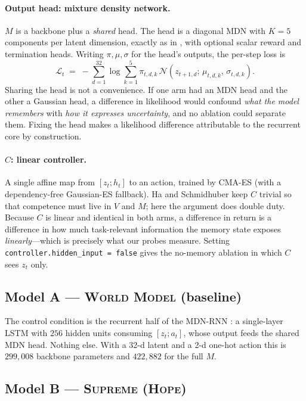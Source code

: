 \documentclass[11pt,a4paper]{article}
\newcommand{\code}[1]{\texttt{\small #1}}
\newcommand{\WM}{\textsc{World Model}}
\newcommand{\SUP}{\textsc{Supreme}}
\begin{document}
\paragraph{Output head: mixture density network.} $M$ is a backbone plus a
\emph{shared} head. The head is a diagonal MDN with $K=5$ components per latent
dimension, exactly as in \cite[\S2.2]{ha2018world}, with optional scalar reward
and termination heads. Writing $\pi,\mu,\sigma$ for the head's outputs, the
per-step loss is
\begin{equation}
\mathcal{L}_t \;=\; -\sum_{d=1}^{32}\log \sum_{k=1}^{5}
   \pi_{t,d,k}\,\mathcal{N}\!\left(z_{t+1,d};\,\mu_{t,d,k},\,\sigma_{t,d,k}\right).
\label{eq:mdn}
\end{equation}
Sharing the head is not a convenience. If one arm had an MDN head and the other
a Gaussian head, a difference in likelihood would confound \emph{what the model
remembers} with \emph{how it expresses uncertainty}, and no ablation could
separate them. Fixing the head makes a likelihood difference attributable to the
recurrent core by construction.

\paragraph{$C$: linear controller.} A single affine map from $[z_t;h_t]$ to an
action, trained by CMA-ES \cite{hansen2006cma} (with a dependency-free
Gaussian-ES fallback). Ha and Schmidhuber keep $C$ trivial so that competence
must live in $V$ and $M$; here the argument does double duty. Because $C$ is
linear and identical in both arms, a difference in return is a difference in how
much task-relevant information the memory state exposes \emph{linearly}---which
is precisely what our probes measure. Setting \code{controller.hidden\_input =
false} gives the no-memory ablation in which $C$ sees $z_t$ only.

\subsection{Model A --- \WM{} (baseline)}

The control condition is the recurrent half of the MDN-RNN
\cite[\S2.2]{ha2018world}: a single-layer LSTM with $256$ hidden units consuming
$[z_t;a_t]$, whose output feeds the shared MDN head. Nothing else. With a 32-d
latent and a 2-d one-hot action this is $299{,}008$ backbone parameters and
$422{,}882$ for the full $M$.

\subsection{Model B --- \SUP{} (\textsc{Hope})}
\end{document}
